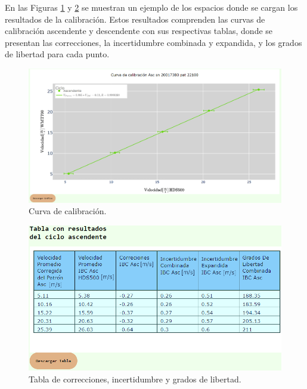 En las Figuras \ref{fig:curvaCalib} y \ref{fig:tablaCalib} se muestran un ejemplo de los espacios donde se cargan los resultados de la calibración. Estos resultados comprenden las curvas de calibración ascendente y descendente con sus respectivas tablas, donde se presentan las correcciones, la incertidumbre combinada y expandida, y los grados de libertad para cada punto.

\begin{figure}[H]
    \centering
    \includegraphics[width=1\linewidth]{Figuras/AplicacionWeb/frontend/curvaCalib.png}
    \caption{Curva de calibración.}
    \label{fig:curvaCalib}
\end{figure}

\begin{figure}[H]
    \centering
    \includegraphics[width=0.7\linewidth]{Figuras/AplicacionWeb/frontend/tablaCalib.png}
    \caption{Tabla de correcciones, incertidumbre y grados de libertad.}
    \label{fig:tablaCalib}
\end{figure}


